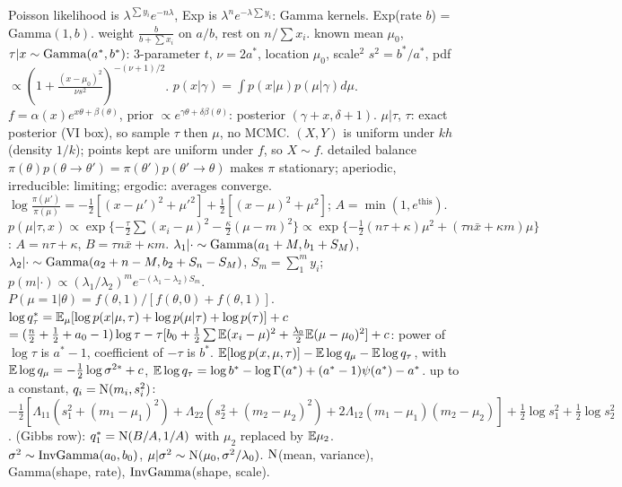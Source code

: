 \li{} Poisson likelihood is $\lambda^{\sum y_i}e^{-n\lambda}$, Exp is $\lambda^ne^{-\lambda\sum y_i}$: Gamma kernels. Exp(rate $b$) = Gamma$(1,b)$.
\li{} weight $\frac b{b+\sum x_i}$ on $a/b$, rest on $n/\sum x_i$.
\li{} known mean $\mu_0$, $\tau|x\sim\mathrm{Gamma}(a^*,b^*)$: 3-parameter $t$, $\nu=2a^*$, location $\mu_0$, scale$^2$ $s^2=b^*/a^*$, pdf $\propto(1+\frac{(x-\mu_0)^2}{\nu s^2})^{-(\nu+1)/2}$.
\li{} $p(x|\gamma)=\int p(x|\mu)p(\mu|\gamma)d\mu$.
\li{} $f=\alpha(x)e^{x\theta+\beta(\theta)}$, prior $\propto e^{\gamma\theta+\delta\beta(\theta)}$: posterior $(\gamma+x,\delta+1)$.
\li{} $\mu|\tau$, $\tau$: exact posterior (VI box), so sample $\tau$ then $\mu$, no MCMC.
 $(X,Y)$ is uniform under $kh$ (density $1/k$); points kept are uniform under $f$, so $X\sim f$.
 detailed balance $\pi(\theta)p(\theta\to\theta')=\pi(\theta')p(\theta'\to\theta)$ makes $\pi$ stationary; aperiodic, irreducible: limiting; ergodic: averages converge.
\sk{} $\log\frac{\pi(\mu')}{\pi(\mu)}=-\frac12[(x-\mu')^2+\mu'^2]+\frac12[(x-\mu)^2+\mu^2]$; $A=\min(1,e^{\text{this}})$.
\sk{} $p(\mu|\tau,x)\propto\exp\{-\frac\tau2\sum(x_i-\mu)^2-\frac\kappa2(\mu-m)^2\}\propto\exp\{-\frac12(n\tau+\kappa)\mu^2+(\tau n\bar x+\kappa m)\mu\}$: $A=n\tau+\kappa$, $B=\tau n\bar x+\kappa m$.
\sk{} $\lambda_1|\cdot\sim\mathrm{Gamma}(a_1+M,b_1+S_M)$, $\lambda_2|\cdot\sim\mathrm{Gamma}(a_2+n-M,b_2+S_n-S_M)$, $S_m=\sum_1^my_i$; $p(m|\cdot)\propto(\lambda_1/\lambda_2)^me^{-(\lambda_1-\lambda_2)S_m}$.
\sk{} $P(\mu=1|\theta)=f(\theta,1)/[f(\theta,0)+f(\theta,1)]$.
 $\log q_\tau^*=\mathbb{E}_\mu[\log p(x|\mu,\tau)+\log p(\mu|\tau)+\log p(\tau)]+c$
$=(\frac n2+\frac12+a_0-1)\log\tau-\tau[b_0+\frac12\sum\mathbb{E}(x_i-\mu)^2+\frac{\lambda_0}2\mathbb{E}(\mu-\mu_0)^2]+c$: power of $\log\tau$ is $a^*-1$, coefficient of $-\tau$ is $b^*$.
\sk{} $\mathbb{E}[\log p(x,\mu,\tau)]-\mathbb{E}\log q_\mu-\mathbb{E}\log q_\tau$, with $\mathbb{E}\log q_\mu=-\frac12\log\sigma^{2*}+c$, $\mathbb{E}\log q_\tau=\log b^*-\log\Gamma(a^*)+(a^*-1)\psi(a^*)-a^*$.
\sk{} up to a constant, $q_i=\mathrm{N}(m_i,s_i^2)$: $-\frac12[\Lambda_{11}(s_1^2+(m_1-\mu_1)^2)+\Lambda_{22}(s_2^2+(m_2-\mu_2)^2)+2\Lambda_{12}(m_1-\mu_1)(m_2-\mu_2)]+\frac12\log s_1^2+\frac12\log s_2^2$.
\sk{} (Gibbs row): $q_1^*=\mathrm{N}(B/A,1/A)$ with $\mu_2$ replaced by $\mathbb{E}\mu_2$.
\sk{} $\sigma^2\sim\mathrm{InvGamma}(a_0,b_0)$, $\mu|\sigma^2\sim\mathrm{N}(\mu_0,\sigma^2/\lambda_0)$.
\li $\mathrm{N}$(mean, variance), Gamma(shape, rate), $\mathrm{InvGamma}$(shape, scale).
